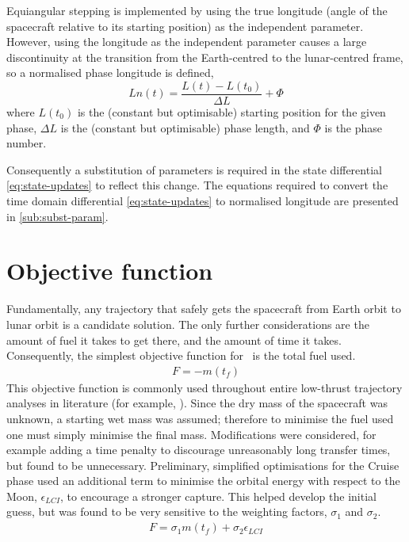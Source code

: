 Equiangular stepping is implemented by using the true longitude (angle of the spacecraft relative to its starting position) as the independent parameter. However, using the longitude as the independent parameter causes a large discontinuity at the transition from the Earth-centred to the lunar-centred frame, so a normalised phase longitude is defined, 
\begin{equation}
Ln(t) = \frac{L(t)-L(t_0)}{\Delta L}+\Phi \label{eq:Ln}
\end{equation}
where $L(t_0)$ is the (constant but optimisable) starting position for the given phase, $\Delta L$ is the (constant but optimisable) phase length, and $\Phi$ is the phase number. 

Consequently a substitution of parameters is required in the state differential \autoref{eq:state-updates} to reflect this change. The equations required to convert the time domain differential \autoref{eq:state-updates} to normalised longitude are presented in \autoref{sub:subst-param}.

\section{Objective function} \label{sub:Objective-function}

Fundamentally, any trajectory that safely gets the spacecraft from Earth orbit to lunar orbit is a candidate solution. The only further considerations are the amount of fuel it takes to get there, and the amount of time it takes. Consequently, the simplest objective function for \BW\ is the total fuel used.
\begin{gather}
F = -m(t_f) \label{eq:objective}
\end{gather}
 This objective function is commonly used throughout entire low-thrust trajectory analyses in literature (for example, \cite{Ichimura2008}). Since the dry mass of the spacecraft was unknown, a starting wet mass was assumed; therefore to minimise the fuel used one must simply minimise the final mass. Modifications were considered, for example adding a time penalty to discourage unreasonably long transfer times, but found to be unnecessary. Preliminary, simplified optimisations for the Cruise phase used an additional term to minimise the orbital energy with respect to the Moon, $\epsilon_{LCI}$, to encourage a stronger capture. This helped develop the initial guess, but was found to be very sensitive to the weighting factors, $\sigma_1$ and $\sigma_2$.
\begin{gather}
F = \sigma_1m(t_f)+\sigma_2\epsilon_{LCI} \label{eq:objective2}
\end{gather}
 
